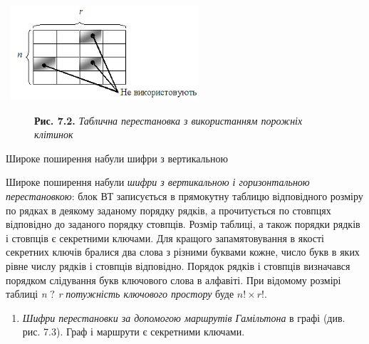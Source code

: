 \bigskip


\bigskip

{\centering 
\includegraphics[width=2.8854in,height=1.3854in]{crypt-img/crypt-img68.png}
\par}



\begin{figure}
\centering
\begin{minipage}{6.1283in}
{\centering
\textbf{Рис. 7.2. }\textit{Таблична перестановка з використанням порожніх
}\textit{\textcolor[rgb]{0.0,0.5019608,0.0}{клітинок}}
\par}


\bigskip


\bigskip


\bigskip


\bigskip
\end{minipage}
\end{figure}
Широке поширення набули шифри з вертикальною 


\bigskip

\textbf{ }Широке \textcolor[rgb]{0.0,0.5019608,0.0}{поширення} набули
\textit{шифри з вертикальною і горизонтальною перестановкою}: блок ВТ
записується  в прямокутну таблицю відповідного розміру по рядках в деякому
заданому порядку рядків, а прочитується по стовпцях відповідно до заданого
порядку стовпців. Розмір таблиці, а також порядки рядків і стовпців є
секретними ключами. Для кращого запам{\textquotesingle}ятовування в якості
секретних ключів бралися  два слова з різними буквами кожне, число букв в яких
рівне числу рядків і стовпців відповідно. Порядок рядків і стовпців визначався
порядком слідування букв ключового слова в алфавіті.  При відомому розмірі
таблиці  \textit{n} $?$ \textit{r }\textit{ потужність ключового простору
}буде $n!\times r!$.

\liststyleWWviiiNumxli
\setcounter{saveenum}{\value{enumi}}
\begin{enumerate}
\setcounter{enumi}{\value{saveenum}}
\item \textit{Шифри перестановки за допомогою маршрутів Гамільтона} в графі
(див. рис. 7.3). Граф і маршрути є секретними ключами.
\end{enumerate}

